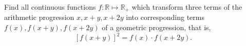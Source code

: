 Find all continuous functions $f : \mathbb{R} \mapsto \mathbb{R}_+$ which transform three terms of the arithmetic progression $x, x + y, x + 2y$ into corresponding terms $f(x), f(x + y), f(x + 2y)$ of a geometric progression, that is,
\[ [f(x + y)]^2 = f(x) \cdot f(x + 2y). \]
